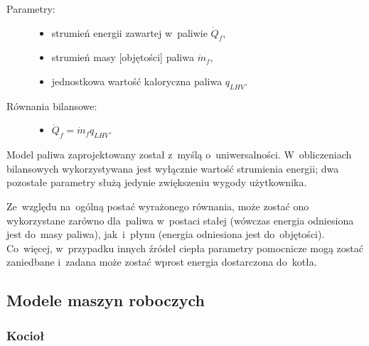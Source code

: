 \begin{description}

	\item[Parametry:] \hfill

		\begin{itemize}

			\item strumień energii zawartej w~paliwie $\dot Q_f$,

			\item strumień masy [objętości] paliwa $\dot m_f$,

			\item jednostkowa wartość kaloryczna paliwa $q_{LHV}$.

		\end{itemize}

	\item[Równania bilansowe:] \hfill

		\begin{itemize}

			\item $\dot Q_f = \dot m_f q_{LHV}$.

		\end{itemize}

\end{description}

Model paliwa zaprojektowany został z~myślą o~uniwersalności.
W~obliczeniach bilansowych wykorzystywana jest wyłącznie wartość
strumienia energii; dwa pozostałe parametry służą jedynie zwiększeniu
wygody użytkownika.

Ze~względu na~ogólną postać wyrażonego równania, może zostać ono
wykorzystane zarówno dla~paliwa w~postaci stałej (wówczas energia
odniesiona jest do~masy paliwa), jak~i~płynu (energia odniesiona jest
do~objętości). Co~więcej, w~przypadku innych źródeł ciepła parametry
pomocnicze mogą zostać zaniedbane i~zadana może zostać wprost energia
dostarczona do~kotła.


\subsection{Modele maszyn roboczych}

\subsubsection{Kocioł}

